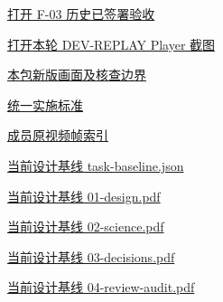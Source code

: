 \documentclass[11pt,a4paper]{article}
\begin{document}
\href{file:///D:/Agent/srp/agent/validation/F-03_\%E6\%8A\%80\%E6\%9C\%AF\%E9\%AA\%8C\%E6\%94\%B6\%E8\%AE\%B0\%E5\%BD\%95_\%E5\%B7\%B2\%E7\%AD\%BE\%E7\%BD\%B2.md}{打开 F-\allowbreak{}03 历史已签署验收}


\href{file:///D:/Agent/srp/agent/tasks/F-03/evidence/runtime/dev-replay-player.png}{打开本轮 DEV-\allowbreak{}REPLAY Player 截图}


\href{file:///D:/Agent/srp/agent/tasks/F-03/outputs/current-implementation-evidence.md}{本包新版画面及核查边界}


\href{file:///D:/Agent/srp/agent/design/weather/2026-10-08_Storm\%E4\%B8\%8E\%E7\%BA\%AF\%E7\%B2\%92\%E5\%AD\%90\%E5\%8F\%8C\%E7\%8E\%AF\%E5\%AE\%9E\%E6\%96\%BD\%E6\%A0\%87\%E5\%87\%86.md}{统一实施标准}


\href{file:///D:/Agent/srp/human/assets/previews/2026-10-08/member-storm-particle-rings/frame-index.json}{成员原视频帧索引}


\href{file:///D:/Agent/srp/agent/design/design-foundation-20261008/task-baseline.json}{当前设计基线 task-\allowbreak{}baseline.json}


\href{file:///D:/Agent/srp/agent/design/design-foundation-20261008/01-design.pdf}{当前设计基线 01-\allowbreak{}design.pdf}


\href{file:///D:/Agent/srp/agent/design/design-foundation-20261008/02-science.pdf}{当前设计基线 02-\allowbreak{}science.pdf}


\href{file:///D:/Agent/srp/agent/design/design-foundation-20261008/03-decisions.pdf}{当前设计基线 03-\allowbreak{}decisions.pdf}


\href{file:///D:/Agent/srp/agent/design/design-foundation-20261008/04-review-audit.pdf}{当前设计基线 04-\allowbreak{}review-\allowbreak{}audit.pdf}
\end{document}
